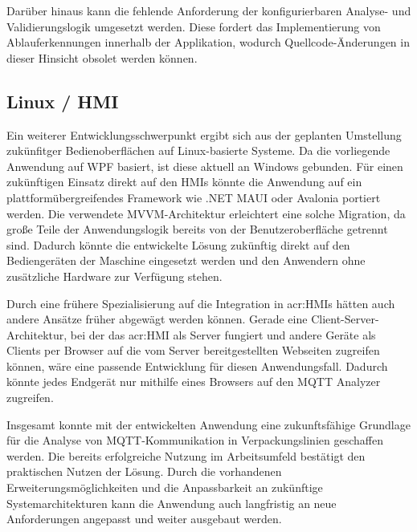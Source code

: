 Darüber hinaus kann die fehlende Anforderung der konfigurierbaren Analyse- und Validierungslogik umgesetzt werden. Diese fordert das Implementierung von Ablauferkennungen innerhalb der Applikation, wodurch Quellcode-Änderungen in dieser Hinsicht obsolet werden können.

\subsection{Linux / HMI}
Ein weiterer Entwicklungsschwerpunkt ergibt sich aus der geplanten Umstellung zukünfitger Bedienoberflächen auf Linux-basierte Systeme. Da die vorliegende Anwendung auf WPF basiert, ist diese aktuell an Windows gebunden. Für einen zukünftigen Einsatz direkt auf den HMIs könnte die Anwendung auf ein plattformübergreifendes Framework wie .NET MAUI oder Avalonia portiert werden. Die verwendete MVVM-Architektur erleichtert eine solche Migration, da große Teile der Anwendungslogik bereits von der Benutzeroberfläche getrennt sind. Dadurch könnte die entwickelte Lösung zukünftig direkt auf den Bediengeräten der Maschine eingesetzt werden und den Anwendern ohne zusätzliche Hardware zur Verfügung stehen.

Durch eine frühere Spezialisierung auf die Integration in \gls{acr:HMI}s hätten auch andere Ansätze früher abgewägt werden können. Gerade eine Client-Server-Architektur, bei der das \gls{acr:HMI} als Server fungiert und andere Geräte als Clients per Browser auf die vom Server bereitgestellten Webseiten zugreifen können, wäre eine passende Entwicklung für diesen Anwendungsfall. Dadurch könnte jedes Endgerät nur mithilfe eines Browsers auf den MQTT Analyzer zugreifen.

Insgesamt konnte mit der entwickelten Anwendung eine zukunftsfähige Grundlage für die Analyse von MQTT-Kommunikation in Verpackungslinien geschaffen werden. Die bereits erfolgreiche Nutzung im Arbeitsumfeld bestätigt den praktischen Nutzen der Lösung. Durch die vorhandenen Erweiterungsmöglichkeiten und die Anpassbarkeit an zukünftige Systemarchitekturen kann die Anwendung auch langfristig an neue Anforderungen angepasst und weiter ausgebaut werden.